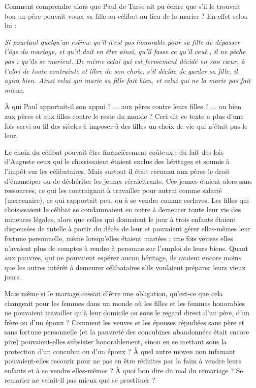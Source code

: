  Comment comprendre alors que Paul de Tarse ait pu écrire que s'il le trouvait bon un père pouvait vouer sa fille au célibat au lieu de la marier ? En effet selon lui :

\begin{displayquote}[I~Cor~7,~36-38]
\emph{Si pourtant quelqu'un estime qu'il n'est pas honorable pour sa fille de dépasser l'âge du mariage, et qu'il doit en être ainsi, qu'il fasse ce qu'il veut ; il ne pèche pas : qu'ils se marient. De même celui qui est fermement décidé en son cœur, à l'abri de toute contrainte et libre de son choix, s'il décide de garder sa fille, il agira bien. Ainsi celui qui marie sa fille fait bien, et celui qui ne la marie pas fait mieux}.
\end{displayquote}

À qui Paul apportait-il son appui ? ... aux pères contre leurs filles ? ... ou bien aux pères et aux filles contre le reste du monde ? Ceci dit ce texte a plus d'une fois servi au fil des siècles à imposer à des filles un choix de vie qui n'était pas le leur. 
 
 Le choix du célibat pouvait être financièrement coûteux : du fait des lois d'Auguste ceux qui le choisissaient étaient exclus des héritages et soumis à l'impôt sur les célibataires. Mais surtout il était reconnu aux pères le droit d'émanciper ou de déshériter les jeunes récalcitrants. Ces jeunes étaient alors sans ressources, ce qui les contraignait à travailler pour autrui comme salarié (mercenaire), ce qui rapportait peu, ou à se vendre comme esclaves. Les filles qui choisissaient le célibat se condamnaient en outre à demeurer toute leur vie des mineures légales, alors que celles qui donnaient le jour à trois enfants étaient dispensées de tutelle à partir du décès de leur  et pouvaient gérer elles-mêmes leur fortune personnelle, même lorsqu'elles étaient mariées : une fois veuves elles n'avaient plus de comptes à rendre à personne sur l'emploi de leurs biens. Quant aux pauvres, qui ne pouvaient espérer aucun héritage, ils avaient encore moins que les autres intérêt à demeurer célibataires s'ils voulaient préparer leurs vieux jours. 

 Mais même si le mariage cessait d'être une obligation, qu'est-ce que cela changeait pour les femmes dans un monde où les filles et les femmes honorables ne pouvaient travailler qu'à leur domicile ou sous le regard direct d'un père, d'un frère ou d'un époux ? Comment les veuves et les épouses répudiées sans père et sans fortune personnelle (et la pauvreté des concubines abandonnées était encore pire) pouvaient-elles subsister honorablement, sinon en se mettant sous la protection d'un concubin ou d'un époux ? À quel autre moyen non infamant pouvaient-elles recourir pour ne pas en être réduites par la faim à vendre leurs enfants et à se vendre elles-mêmes ? À quoi bon dire du mal du remariage ? Se remarier ne valait-il pas mieux que se prostituer ?

